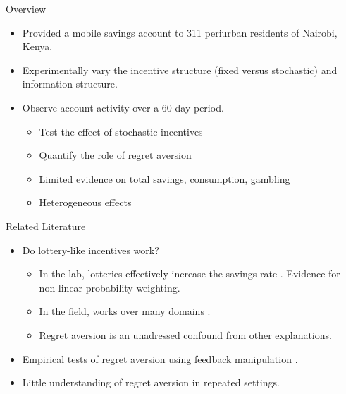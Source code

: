 \documentclass[aspectratio=169]{beamer}
\begin{document}
\begin{frame}{Overview}

	\begin{itemize}

		\item Provided a mobile savings account to 311 periurban residents of Nairobi, Kenya.
		\item Experimentally vary the incentive structure (fixed versus stochastic) and information structure.
		\item Observe account activity over a 60-day period.

		\begin{itemize}
			\item Test the effect of stochastic incentives
			\item Quantify the role of regret aversion
			\item Limited evidence on total savings, consumption, gambling
			\item Heterogeneous effects
		\end{itemize}

	\end{itemize}

\end{frame}

\begin{frame}{Related Literature}
	
	\begin{itemize}

		\item Do lottery-like incentives work? 
		
		\begin{itemize}
			\item In the lab, lotteries effectively increase the savings rate \parencite{atalay_savings_2014,filiz-ozbay_lottery_2015}. Evidence for non-linear probability weighting.
			\item In the field, works over many domains \parencite{dizon_leveraging_2016,gajic_cost-effectiveness_2011,brune_effect_2015,loibl_testing_2016}.
			\item Regret aversion is an unadressed confound from other explanations.
		\end{itemize}

		\item Empirical tests of regret aversion using feedback manipulation \parencite{zeelenberg_consequences_1996,zeelenberg_consequences_2004,filiz-ozbay_auctions_2007}.
		
		\item Little understanding of regret aversion in repeated settings.


	\end{itemize}

\end{frame}
\end{document}
